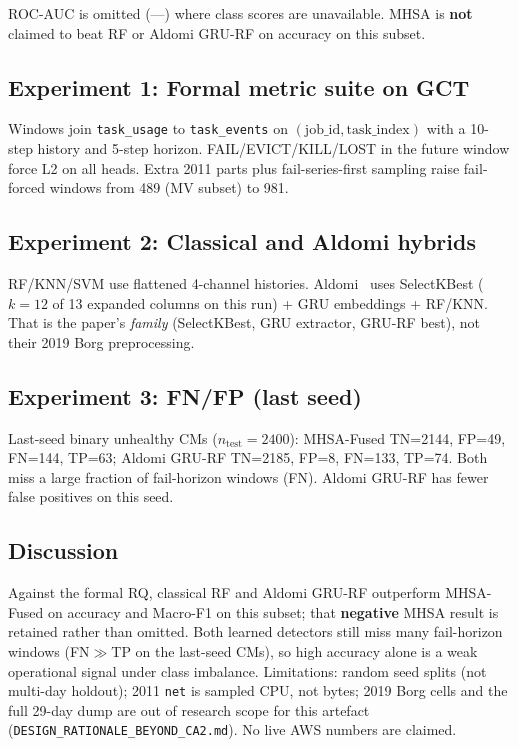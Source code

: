 ROC-AUC is omitted (---) where class scores are unavailable. MHSA is \textbf{not} claimed to beat RF or Aldomi GRU-RF on accuracy on this subset.

\subsection{Experiment 1: Formal metric suite on GCT}
\label{sec:evalOne}

Windows join \texttt{task\_usage} to \texttt{task\_events} on $(\mathrm{job\_id},\mathrm{task\_index})$ with a 10-step history and 5-step horizon. FAIL/EVICT/KILL/LOST in the future window force L2 on all heads. Extra 2011 parts plus fail-series-first sampling raise fail-forced windows from 489 (MV subset) to 981.

\subsection{Experiment 2: Classical and Aldomi hybrids}
\label{sec:evalTwo}

RF/KNN/SVM use flattened 4-channel histories. Aldomi~\cite{Aldomi26} uses SelectKBest ($k{=}12$ of 13 expanded columns on this run) + GRU embeddings + RF/KNN. That is the paper's \emph{family} (SelectKBest, GRU extractor, GRU-RF best), not their 2019 Borg preprocessing.

\subsection{Experiment 3: FN/FP (last seed)}
\label{sec:evalThree}

Last-seed binary unhealthy CMs ($n_{\mathrm{test}}{=}2400$): MHSA-Fused TN=2144, FP=49, FN=144, TP=63; Aldomi GRU-RF TN=2185, FP=8, FN=133, TP=74. Both miss a large fraction of fail-horizon windows (FN). Aldomi GRU-RF has fewer false positives on this seed.

\subsection{Discussion}
\label{sec:discussion}

Against the formal RQ, classical RF and Aldomi GRU-RF outperform MHSA-Fused on accuracy and Macro-F1 on this subset; that \textbf{negative} MHSA result is retained rather than omitted. Both learned detectors still miss many fail-horizon windows (FN$\gg$TP on the last-seed CMs), so high accuracy alone is a weak operational signal under class imbalance. Limitations: random seed splits (not multi-day holdout); 2011 \texttt{net} is sampled CPU, not bytes; 2019 Borg cells and the full 29-day dump are out of research scope for this artefact (\texttt{DESIGN\_RATIONALE\_BEYOND\_CA2.md}). No live AWS numbers are claimed.
